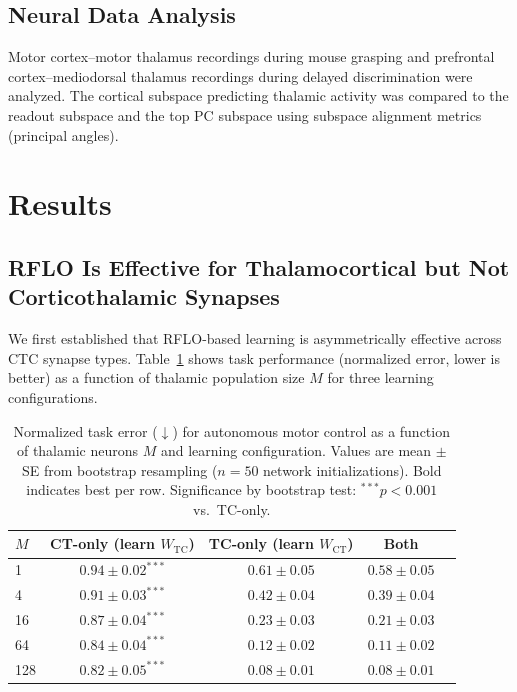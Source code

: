 \documentclass[11pt]{article}
\begin{document}
\subsection{Neural Data Analysis}

Motor cortex--motor thalamus recordings during mouse grasping and prefrontal cortex--mediodorsal thalamus recordings during delayed discrimination were analyzed. The cortical subspace predicting thalamic activity was compared to the readout subspace and the top PC subspace using subspace alignment metrics (principal angles).

\section{Results}

\subsection{RFLO Is Effective for Thalamocortical but Not Corticothalamic Synapses}

We first established that RFLO-based learning is asymmetrically effective across CTC synapse types. Table~\ref{tab:learning_rule} shows task performance (normalized error, lower is better) as a function of thalamic population size $M$ for three learning configurations.

\begin{table}[H]
\centering
\caption{Normalized task error ($\downarrow$) for autonomous motor control as a function of thalamic neurons $M$ and learning configuration. Values are mean $\pm$ SE from bootstrap resampling ($n = 50$ network initializations). Bold indicates best per row. Significance by bootstrap test: $^{***}p<0.001$ vs.\ TC-only.}
\label{tab:learning_rule}
\begin{tabular}{lcccc}
\toprule
$M$ & CT-only (learn $W_{\text{TC}}$) & TC-only (learn $W_{\text{CT}}$) & Both \\
\midrule
1 & $0.94 \pm 0.02^{***}$ & $0.61 \pm 0.05$ & $\mathbf{0.58 \pm 0.05}$ \\
4 & $0.91 \pm 0.03^{***}$ & $0.42 \pm 0.04$ & $\mathbf{0.39 \pm 0.04}$ \\
16 & $0.87 \pm 0.04^{***}$ & $0.23 \pm 0.03$ & $\mathbf{0.21 \pm 0.03}$ \\
64 & $0.84 \pm 0.04^{***}$ & $\mathbf{0.12 \pm 0.02}$ & $0.11 \pm 0.02$ \\
128 & $0.82 \pm 0.05^{***}$ & $\mathbf{0.08 \pm 0.01}$ & $0.08 \pm 0.01$ \\
\bottomrule
\end{tabular}
\end{table}
\end{document}
